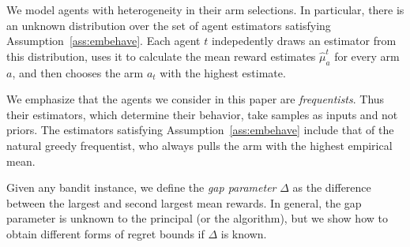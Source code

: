 We model agents with heterogeneity in their arm selections. In particular, there is an unknown distribution over the set of agent estimators satisfying Assumption~\ref{ass:embehave}.  Each agent $t$ indepedently draws an estimator from this distribution, uses it to calculate the mean reward estimates $\hat{\mu}_a^t$ for every arm $a$, and then chooses the arm $a_t$ with the highest estimate. 

\begin{remark}
We emphasize that the agents we consider in this paper are {\em frequentists}.  Thus their estimators, which determine their behavior, take samples as inputs and not priors.  The estimators satisfying Assumption~\ref{ass:embehave} include that of the natural greedy frequentist, who always pulls the arm with the highest empirical mean.
\end{remark}

Given any bandit instance, we define the \emph{gap parameter} $\Delta$ as the difference between the largest and second largest mean rewards. In general, the gap parameter is unknown to the principal (or the algorithm), but we show how to obtain different forms of regret bounds if $\Delta$ is known.



